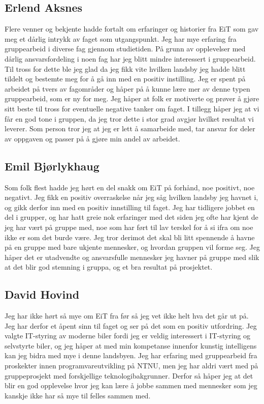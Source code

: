 \subsection*{Erlend Aksnes} Flere venner og bekjente hadde fortalt om erfaringer og historier fra EiT som gav meg et dårlig intrykk av faget som utgangspunkt. 
Jeg har mye erfaring fra gruppearbeid i diverse fag gjennom studietiden.
 På grunn av opplevelser med dårlig ansvarsfordeling i noen fag har jeg blitt mindre interessert i gruppearbeid. 
Til tross for dette ble jeg glad da jeg fikk vite hvilken landsby jeg hadde blitt tildelt og bestemte meg for å gå inn med en positiv instilling.
Jeg er spent på arbeidet på tvers av fagområder og håper på å kunne lære mer av denne typen gruppearbeid, som er ny for meg.  
Jeg håper at folk er motiverte og prøver å gjøre sitt beste til tross for eventuelle negative tanker om faget. 
I tillegg håper jeg at vi får en god tone i gruppen, da jeg tror dette i stor grad avgjør hvilket resultat vi leverer. 
Som person tror jeg at jeg er lett å samarbeide med, tar ansvar for deler av oppgaven og passer på å gjøre min andel av arbeidet. 

\subsection*{Emil Bjørlykhaug}
Som folk flest hadde jeg hørt en del snakk om EiT på forhånd, noe positivt, noe negativt. 
Jeg fikk en positiv overraskelse når jeg såg hvilken landsby jeg havnet i, og gikk derfor 
inn med en positiv innstilling til faget. Jeg har tidligere jobbet en del i grupper, og har 
hatt greie nok erfaringer med det siden jeg ofte har kjent de jeg har vært på gruppe med, 
noe som har ført til lav terskel for å si ifra om noe ikke er som det burde være. 
Jeg tror derimot det skal bli litt spennende å havne på en gruppe med bare ukjente mennesker, 
og hvordan gruppen vil forme seg. Jeg håper det er utadvendte og ansvarsfulle mennesker jeg 
havner på gruppe med slik at det blir god stemning i gruppa, og et bra resultat på prosjektet.

\subsection*{David Hovind} Jeg har ikke hørt så mye om EiT fra før så jeg vet ikke helt hva det går ut på. 
Jeg har derfor et åpent sinn til faget og ser på det som en positiv utfordring. Jeg valgte IT-styring av moderne
biler fordi jeg er veldig interessert i IT-styring og selvstyrte biler, og jeg håper at med min kompetanse innenfor 
kunstig intelligens kan jeg bidra med mye i denne landsbyen. Jeg har erfaring med gruppearbeid fra proskekter 
innen programvareutvikling på NTNU, men jeg har aldri vært med på gruppeprosjekt med forskjellige teknologibakgrunner.
Derfor så håper jeg at det blir en god opplevelse hvor jeg kan lære å jobbe sammen med mennesker som jeg kanskje ikke
har så mye til felles sammen med.

